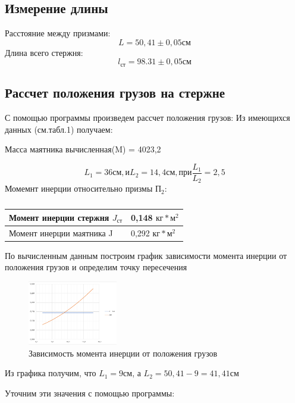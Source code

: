 \documentclass[a4paper]{article}
\begin{document}
\subsection{Измерение длины}
Расстояние между призмами: 
\[L = 50,41\pm 0,05\text{см}\]
Длина всего стержня:
\[l_{\text{ст}} = 98.31\pm 0,05\text{см}\]

\subsection{Рассчет положения грузов на стержне}
С помощью программы произведем рассчет положения грузов:
Из имеющихся данных (см.табл.1) получаем:\par
Масса маятника вычисленная(M) = 4023,2\par
\[L_{1}= 36\text{см}, \text{и} L_{2}= 14,4\text{см}, \text{при} \frac{L_{1}}{L_{2}}=2,5 \]
Момемнт инерции относительно призмы $\text{П}_{2}$:

\begin{table}[!h]
    \begin{center}
    \begin{tabular}{|l|l|}
    \hline
    Момент инерции стержня $J_{\text{ст}}$                        & 0,148 $\text{кг}*\text{м}^2$                      \\ \hline
    Момент инерции маятника J                        & 0,292 $\text{кг}*\text{м}^2$                   \\ \hline
    \end{tabular}
    \caption{}
    \end{center}
    \end{table}

По вычисленным данным построим график зависимости момента инерции от положения грузов и определим точку пересечения
\begin{figure}[h]
    \centering
    \includegraphics[width=0.35\textwidth]{pick3.PNG} 
    \caption{Зависимость момента инерции от положения грузов}
    \end{figure}

Из графика получим, что $L_{1} = 9 \text{см}$, а $L_{2} = 50,41-9=41,41 \text{см}$\par
Уточним эти значения с помощью программы: 
\end{document}
